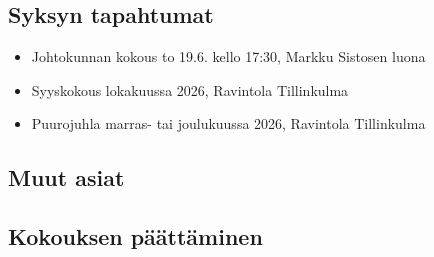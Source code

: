 \documentclass[a4paper,12pt]{article}
\begin{document}
\subsection{Syksyn tapahtumat}
\begin{itemize}
\item{Johtokunnan kokous} to 19.6. kello 17:30, Markku Sistosen luona
\item{Syyskokous} lokakuussa 2026, Ravintola Tillinkulma
\item{Puurojuhla} marras- tai joulukuussa 2026, Ravintola Tillinkulma
\end{itemize}
\subsection{Muut asiat}
\subsection{Kokouksen päättäminen}
\end{document}
